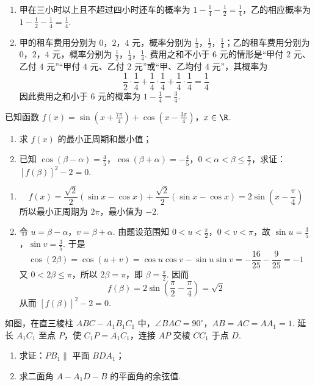 \begin{solution}
\begin{enumerate}
\item 甲在三小时以上且不超过四小时还车的概率为 \(1-\frac14-\frac12=\frac14\)，乙的相应概率为 \(1-\frac12-\frac14=\frac14\).
\item 甲的租车费用分别为 \(0\)，\(2\)，\(4\) 元，概率分别为 \(\frac14\)，\(\frac12\)，\(\frac14\)；乙的租车费用分别为 \(0\)，\(2\)，\(4\) 元，概率分别为 \(\frac12\)，\(\frac14\)，\(\frac14\). 费用之和不小于 \(6\) 元的情形是“甲付 \(2\) 元、乙付 \(4\) 元”“甲付 \(4\) 元、乙付 \(2\) 元”或“甲、乙均付 \(4\) 元”，其概率为
\[
\frac12\cdot\frac14+\frac14\cdot\frac14+\frac14\cdot\frac14=\frac14
\]
因此费用之和小于 \(6\) 元的概率为 \(1-\frac14=\frac34\).
\end{enumerate}
\end{solution}

\begin{problem}
已知函数 \(f(x) = \sin \left( x + \frac{7\pi}{4} \right) + \cos \left( x - \frac{3\pi}{4} \right)\)，\(x \in \R\).
\begin{enumerate}
\item 求 \(f(x)\) 的最小正周期和最小值；
\item 已知 \(\cos(\beta - \alpha) = \frac{4}{5}\)，\(\cos(\beta + \alpha) = -\frac{4}{5}\)，\(0 < \alpha < \beta \leqslant \frac{\pi}{2}\)，求证：\([f(\beta)]^2 - 2 = 0\).
\end{enumerate}
\end{problem}

\begin{solution}
\begin{enumerate}
\item
\[
f(x)=\frac{\sqrt2}{2}(\sin x-\cos x)+\frac{\sqrt2}{2}(\sin x-\cos x)=2\sin\left(x-\frac\pi4\right)
\]
所以最小正周期为 \(2\pi\)，最小值为 \(-2\).
\item 令 \(u=\beta-\alpha\)，\(v=\beta+\alpha\). 由题设范围知 \(0<u<\frac\pi2\)，\(0<v<\pi\)，故 \(\sin u=\frac35\)，\(\sin v=\frac35\). 于是
\[
\cos(2\beta)=\cos(u+v)=\cos u\cos v-\sin u\sin v=-\frac{16}{25}-\frac9{25}=-1
\]
又 \(0<2\beta\leqslant\pi\)，所以 \(2\beta=\pi\)，即 \(\beta=\frac\pi2\). 因而
\[
f(\beta)=2\sin\left(\frac\pi2-\frac\pi4\right)=\sqrt2
\]
从而 \([f(\beta)]^2-2=0\).
\end{enumerate}
\end{solution}

\begin{problem}
如图，在直三棱柱 \(ABC - A_{1}B_{1}C_{1}\) 中，\(\angle BAC = 90^{\circ}\)，\(AB = AC = AA_{1} = 1\). 延长 \(A_{1}C_{1}\) 至点 \(P\)，使 \(C_{1}P = A_{1}C_{1}\)，连接 \(AP\) 交棱 \(CC_{1}\) 于点 \(D\).
\begin{enumerate}
\item 求证：\(PB_{1} \parallel\) 平面 \(BDA_{1}\)；
\item 求二面角 \(A - A_{1}D - B\) 的平面角的余弦值.
\end{enumerate}
\end{problem}

